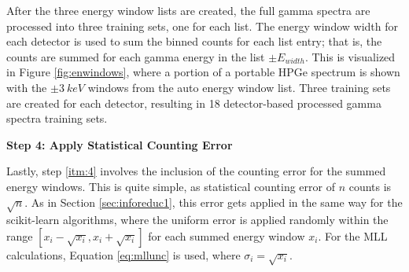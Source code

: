 After the three energy window lists are created, the full gamma spectra are
processed into three training sets, one for each list.  The energy window width
for each detector is used to sum the binned counts for each list entry; that
is, the counts are summed for each gamma energy in the list $\pm E_{width}$.
This is visualized in Figure \ref{fig:enwindows}, where a portion of a portable
\gls{HPGe} spectrum is shown with the $\pm3\:keV$ windows from the auto energy
window list.  Three training sets are created for each detector, resulting in
18 detector-based processed gamma spectra training sets.

\noindent \textbf{Step 4: Apply Statistical Counting Error}

Lastly, step \ref{itm:4} involves the inclusion of the counting error for the
summed energy windows. This is quite simple, as statistical counting error of
$n$ counts is $\sqrt{n}$.  As in Section \ref{sec:inforeduc1}, this error gets
applied in the same way for the scikit-learn algorithms, where the uniform
error is applied randomly within the range $[x_i - \sqrt{x_i}, x_i +
\sqrt{x_i}]$ for each summed energy window $x_i$. For the \gls{MLL}
calculations, Equation \ref{eq:mllunc} is used, where $\sigma_{i} =
\sqrt{x_i}$.  

